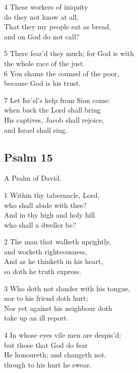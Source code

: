 4 These workers of iniquity\\
do they not know at all,\\
That they my people eat as bread,\\
and on God do not call?

5 There fear’d they much; for God is with\\
the whole race of the just.\\
6 You shame the counsel of the poor,\\
because God is his trust.

7 Let Isr’el’s help from Sion come:\\
when back the Lord shall bring\\
His captives, Jacob shall rejoice,\\
and Israel shall sing.

\begin{center}
\quad{}\quad{}
\end{center}

\subsection*{Psalm 15 }

A Psalm of David.

1 Within thy tabernacle, Lord,\\
who shall abide with thee?\\
And in thy high and holy hill\\
who shall a dweller be?

2 The man that walketh uprightly,\\
and worketh righteousness,\\
And as he thinketh in his heart,\\
so doth he truth express.

3 Who doth not slander with his tongue,\\
nor to his friend doth hurt;\\
Nor yet against his neighbour doth\\
take up an ill report.

4 In whose eyes vile men are despis’d;\\
but those that God do fear\\
He honoureth; and changeth not,\\
though to his hurt he swear.


